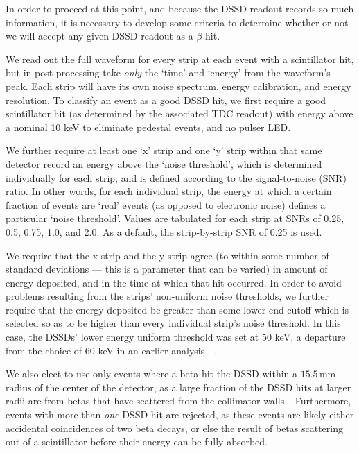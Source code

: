 In order to proceed at this point, and because the DSSD readout records so much information, it is necessary to develop some criteria to determine whether or not we will accept any given DSSD readout as a $\beta$ hit.



We read out the full waveform for every strip at each event with a scintillator hit, but in post-processing take \emph{only} the `time' and `energy' from the waveform's peak.
Each strip will have its own noise spectrum, energy calibration, and energy resolution.  To classify an event as a good DSSD hit, we first require a good scintillator hit (as determined by the associated TDC readout) with energy above a nominal 10 keV to eliminate pedestal events, and no pulser LED.

	We further require at least one `x' strip and one `y' strip within that same detector record an energy above the `noise threshold', which is determined individually for each strip, and is defined according to the signal-to-noise (SNR) ratio.  In other words, for each individual strip, the energy at which a certain fraction of events are `real' events (as opposed to electronic noise) defines a particular `noise threshold'.  Values are tabulated for each strip at SNRs of 0.25, 0.5, 0.75, 1.0, and 2.0.  As a default, the strip-by-strip SNR of 0.25 is used.~  


	We require that the x strip and the y strip agree (to within some number of standard deviations --- this is a parameter that can be varied) in amount of energy deposited, and in the time at which that hit occurred.  In order to avoid problems resulting from the strips' non-uniform noise thresholds, we further require that the energy deposited be greater than some lower-end cutoff which is selected so as to be higher than every individual strip's noise threshold.  In this case, the DSSDs' lower energy uniform threshold was set at 50 keV, a departure from the choice of 60 keV in an earlier analysis~\cite{ben_Abeta}~\cite{ben_thesis}.


We also elect to use only events where a beta hit the DSSD within a $15.5\,$mm radius of the center of the detector, as a large fraction of the DSSD hits at larger radii are from betas that have scattered from the collimator walls.~ Furthermore, events with more than \emph{one} DSSD hit are rejected, as these events are likely either accidental coincidences of two beta decays, or else the result of betas scattering out of a scintillator before their energy can be fully absorbed.  



